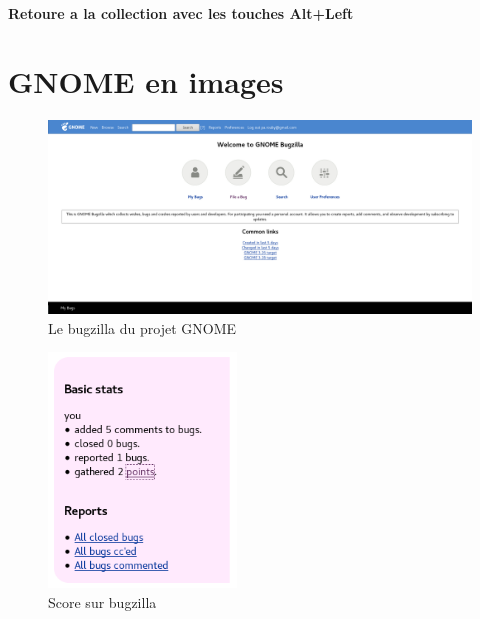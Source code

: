\documentclass[12pt]{report}
\begin{document}
\subsubsection{Retoure a la collection avec les touches Alt+Left}

\appendix
\chapter{GNOME en images}

\begin{figure}[p]
  \caption{\label{figure_bugzilla} Le bugzilla du projet GNOME}
  \includegraphics[width=15cm]{images/bugzilla_gnome_org.png}
\end{figure}

\begin{figure}[p]
  \caption{\label{figure_bugzilla_score} Score sur bugzilla}
  \includegraphics[width=5cm]{images/score.png}
\end{figure}
\end{document}
